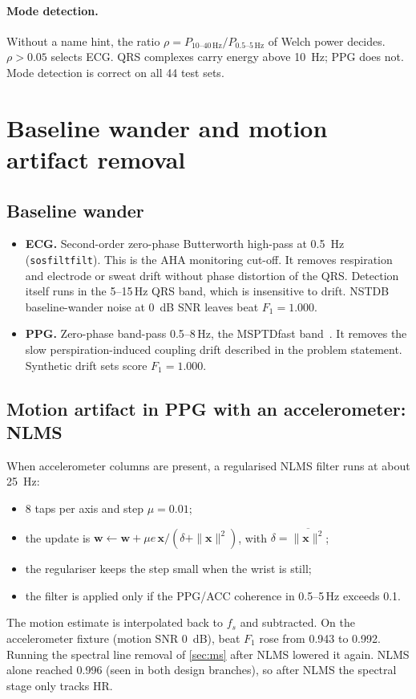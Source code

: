 \documentclass[10pt,a4paper]{article}
\newcommand{\code}[1]{\texttt{#1}}
\begin{document}
\paragraph{Mode detection.}
Without a name hint, the ratio $\rho = P_{10\text{--}40\,\mathrm{Hz}} / P_{0.5\text{--}5\,\mathrm{Hz}}$ of Welch power
decides. $\rho > 0.05$ selects ECG. QRS complexes carry energy above \SI{10}{Hz}; PPG does not. Mode detection is
correct on all 44 test sets.

\section{Baseline wander and motion artifact removal}

\subsection{Baseline wander}
\begin{itemize}
  \item \textbf{ECG.} Second-order zero-phase Butterworth high-pass at \SI{0.5}{Hz} (\code{sosfiltfilt}). This is the
        AHA monitoring cut-off. It removes respiration and electrode or sweat drift without phase distortion of the QRS.
        Detection itself runs in the 5--15\,Hz QRS band, which is insensitive to drift. NSTDB baseline-wander noise at
        \SI{0}{dB} SNR leaves beat $F_1 = 1.000$.
  \item \textbf{PPG.} Zero-phase band-pass 0.5--8\,Hz, the MSPTDfast band~\cite{msptdfast}. It removes the slow
        perspiration-induced coupling drift described in the problem statement. Synthetic drift sets score
        $F_1=1.000$.
\end{itemize}

\subsection{Motion artifact in PPG with an accelerometer: NLMS}
When accelerometer columns are present, a regularised NLMS filter runs at about \SI{25}{Hz}:
\begin{itemize}
  \item 8 taps per axis and step $\mu=0.01$;
  \item the update is $\mathbf w \leftarrow \mathbf w + \mu e\,\mathbf x/(\delta+\|\mathbf x\|^2)$, with
        $\delta=\overline{\|\mathbf x\|^2}$;
  \item the regulariser keeps the step small when the wrist is still;
  \item the filter is applied only if the PPG/ACC coherence in 0.5--5\,Hz exceeds 0.1.
\end{itemize}
The motion estimate is interpolated back to $f_s$ and subtracted. On the accelerometer fixture (motion SNR \SI{0}{dB}), beat
$F_1$ rose from 0.943 to 0.992. Running the spectral line removal of \cref{sec:ms} after NLMS lowered it again. NLMS
alone reached 0.996 (seen in both design branches), so after NLMS the spectral stage only tracks HR.
\end{document}
